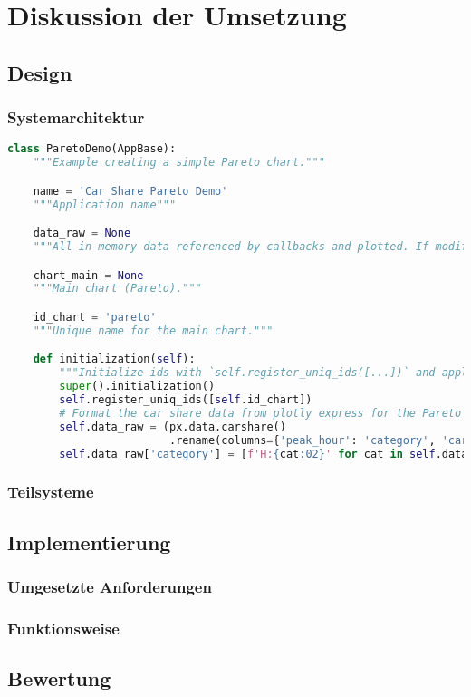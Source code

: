 \chapter{Diskussion der Umsetzung}
\section{Design}
    \subsection{Systemarchitektur}

    \begin{lstlisting}[language=Python, caption=Python example]
    class ParetoDemo(AppBase):
    """Example creating a simple Pareto chart."""

    name = 'Car Share Pareto Demo'
    """Application name"""

    data_raw = None
    """All in-memory data referenced by callbacks and plotted. If modified, will impact all viewers."""

    chart_main = None
    """Main chart (Pareto)."""

    id_chart = 'pareto'
    """Unique name for the main chart."""

    def initialization(self):
        """Initialize ids with `self.register_uniq_ids([...])` and application data."""
        super().initialization()
        self.register_uniq_ids([self.id_chart])
        # Format the car share data from plotly express for the Pareto
        self.data_raw = (px.data.carshare()
                         .rename(columns={'peak_hour': 'category', 'car_hours': 'value'}))
        self.data_raw['category'] = [f'H:{cat:02}' for cat in self.data_raw['category']]
    \end{lstlisting}

    \subsection{Teilsysteme}

\section{Implementierung}
    \subsection{Umgesetzte Anforderungen}
    \subsection{Funktionsweise}

\section{Bewertung}